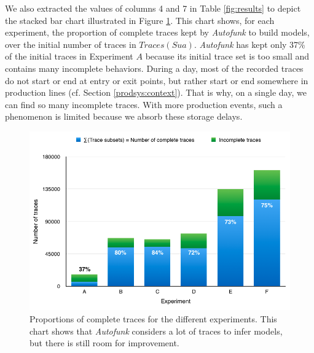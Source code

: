 We also extracted the values of columns 4 and 7 in Table
\ref{fig:results} to depict the stacked bar chart illustrated in
Figure \ref{fig:proportions}. This chart shows, for each
experiment, the proportion of complete traces kept by
\textit{Autofunk} to build models, over the initial number of
traces in $Traces(Sua)$.  \textit{Autofunk} has kept only 37\% of
the initial traces in Experiment $A$ because its initial trace
set is too small and contains many incomplete behaviors. During a
day, most of the recorded traces do not start or end at entry or
exit points, but rather start or end somewhere in production
lines (cf. Section \ref{prodsys:context}). That is why, on a
single day, we can find so many incomplete traces. With more
production events, such a phenomenon is limited because we absorb
these storage delays.

\begin{figure}[ht]
  \includegraphics[width=1.0\linewidth]{figures/proportions.png}

  \caption{Proportions of complete traces for the different
  experiments. This chart shows that \textit{Autofunk} considers
  a lot of traces to infer models, but there is still room for
  improvement.}
  \label{fig:proportions}
\end{figure}


